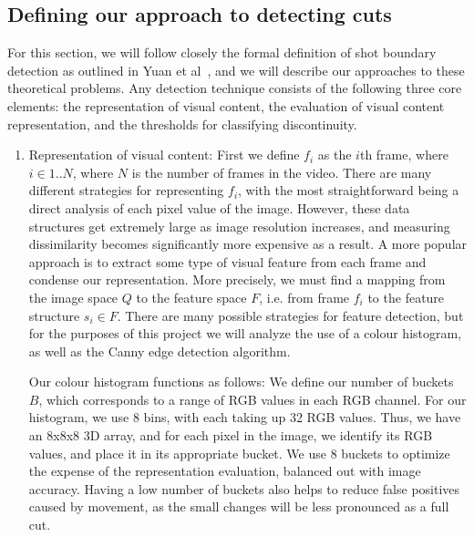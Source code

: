 \documentclass[12pt]{article}
\begin{document}
\subsection{Defining our approach to detecting cuts}
For this section, we will follow closely the formal definition of shot boundary detection as outlined in Yuan et al~\cite{survey1}, and we will describe our approaches to these 
theoretical problems. Any detection technique consists of the following three core elements: the representation of visual content, the evaluation of visual content 
representation, and the thresholds for classifying discontinuity.
\begin{enumerate}
    \item Representation of visual content: First we define $f_i$ as the $i$th frame, where $i \in 1 .. N$, where $N$ is the number of frames in the video. There are many 
    different strategies for representing $f_i$, with the most straightforward being a direct analysis of each pixel value of the image. However, these data structures get 
    extremely large as image resolution increases, and measuring dissimilarity becomes significantly more expensive as a result. A more popular approach is to extract 
    some type of visual feature from each frame and condense our representation. More precisely, we must find a mapping from the image space $Q$ to the feature space $F$,
    i.e. from frame $f_i$ to the feature structure $s_i \in F$. There are many possible strategies for feature detection, but for the purposes of this project we will 
    analyze the use of a colour histogram, as well as the Canny edge detection algorithm. 

    Our colour histogram functions as follows: We define our number of buckets $B$, which corresponds to a range of RGB values in each RGB channel. For our histogram, we use 
    8 bins, with each taking up 32 RGB values. Thus, we have an 8x8x8 3D array, and for each pixel in the image, we identify its RGB values, and place it in its appropriate 
    bucket. We use 8 buckets to optimize the expense of the representation evaluation, balanced out with image accuracy. Having a low number of buckets also helps to reduce 
    false positives caused by movement, as the small changes will be less pronounced as a full cut. 


\end{enumerate}
\end{document}
